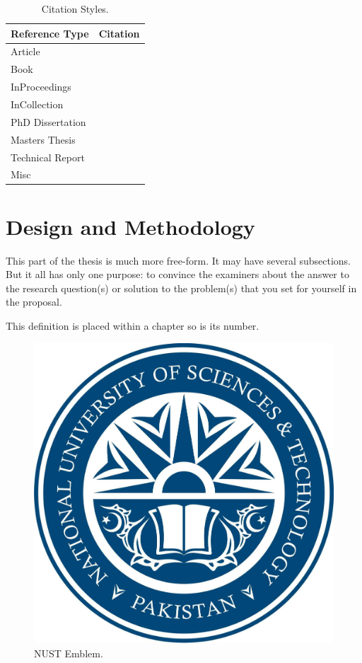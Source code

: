 \documentclass[11pt,a4paper,oneside]{book} %
\numberwithin{equation}{section}
\begin{document}
\begin{table}[!th]
\centering


\begin{tabular}{|p{3cm}|p{9cm}|}
\hline
\textbf{Reference Type} & \textbf{Citation}\\ \hline
Article & \cite{Hayes1993}\\ \hline
Book & \cite[p.127-133]{Lamport2005}\\ \hline
InProceedings & \cite*{Nicholls1987}\\ \hline
InCollection & \cite{Lund2019}\\ \hline
PhD Dissertation & \cite{Konnov2019}\\ \hline
Masters Thesis & \cite{Lamport2005}\\ \hline
Technical Report & \cite{Engberg1993}\\ \hline
Misc & \cite{Hayes1993}\\ \hline
\end{tabular}
\caption{Citation Styles.}
\label{t-References}
\end{table}



\chapter{Design and Methodology}
\label{c-methods}

This part of the thesis is much more free-form. It may have several subsections. But it all has only one purpose: to convince the examiners about the answer to the research question(s) or solution to the problem(s) that you set for yourself in the proposal.

\begin{definition}[Testing 1,2,3]
This definition is placed within a chapter so is its number.
\end{definition}

\begin{figure}[htp]
\begin{center}
  \includegraphics[width=0.7\columnwidth]{nust.jpg}
  \caption{NUST Emblem.}
  \label{f-nust}
\end{center}
\end{figure}
\end{document}

